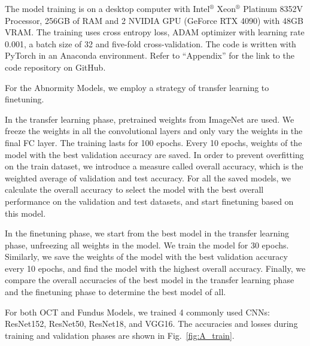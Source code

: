 \documentclass{article}
\begin{document}
	The model training is on a desktop computer with Intel$^®$ Xeon$^®$ Platinum 8352V Processor, 256GB of RAM and 2 NVIDIA GPU (GeForce RTX 4090) with 48GB VRAM. The training uses cross entropy loss, ADAM optimizer with learning rate 0.001, a batch size of 32 and five-fold cross-validation. The code is written with PyTorch in an Anaconda environment. Refer to ``Appendix'' for the link to the code repository on GitHub. 
	
	\vspace{0.3cm}
	
	For the Abnormity Models, we employ a strategy of transfer learning to finetuning. 
	
	In the transfer learning phase, pretrained weights from ImageNet \autocite{Krizhevsky_Sutskever_Hinton_2017} are used. We freeze the weights in all the convolutional layers and only vary the weights in the final FC layer. The training lasts for 100 epochs. Every 10 epochs, weights of the model with the best validation accuracy are saved. In order to prevent overfitting on the train dataset, we introduce a measure called overall accuracy, which is the weighted average of validation and test accuracy. For all the saved models, we calculate the overall accuracy to select the model with the best overall performance on the validation and test datasets, and start finetuning based on this model. 
	
	In the finetuning phase, we start from the best model in the transfer learning phase, unfreezing all weights in the model. We train the model for 30 epochs. Similarly, we save the weights of the model with the best validation accuracy every 10 epochs, and find the model with the highest overall accuracy. Finally, we compare the overall accuracies of the best model in the transfer learning phase and the finetuning phase to determine the best model of all. 
	
	For both OCT and Fundus Models, we trained 4 commonly used CNNs: ResNet152, ResNet50, ResNet18, and VGG16. The accuracies and losses during training and validation phases are shown in Fig.~\ref{fig:A_train}. 
	
	\pagebreak
		
\end{document}

